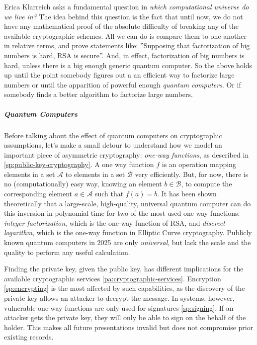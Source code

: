 Erica Klarreich asks a fundamental question in \emph{which computational universe do we live in?}\cite{KlarUniverse22}
The idea behind this question is the fact that until now, we do not have any mathematical proof of the absolute difficulty
of breaking any of the available cryptographic schemes.
All we can do is compare them to one another in relative terms, and prove statements like: 
''Supposing that factorization of big numbers is hard, RSA is secure''.
And, in effect, factorization of big numbers is hard, unless there is a big enough generic quantum computer.
So the above holds up until the point somebody figures out a an efficient way to factorize large numbers or until the apparition of powerful enough \emph{quantum computers}.
Or if somebody finds a better algorithm to factorize large numbers. 

\subparagraph{Quantum Computers}

Before talking about the effect of quantum computers on cryptographic assumptions, let's make a small detour to understand how we model an important piece of asymmetric cryptography: \emph{one-way functions}, as described in
\ref{sp:public-key-cryptography}.
A one way function $f$ is an operation mapping elements in a set $\mathcal{A}$ to elements in a set $\mathcal{B}$ very efficiently. But, for now, there is no (computationally) easy way, knowing an element $b \in \mathcal{B}$, to compute the corresponding element $a \in \mathcal{A}$ such that $f(a) = b$.
It has been shown theoretically that a large-scale, high-quality, universal
quantum computer \cite[s. 2.1]{TaurusQuantum23} can do this inversion in polynomial time for two of the most used one-way functions: 
\emph{integer factorization}, which is the one-way function of RSA, 
and \emph{discreet logarithm}, which is the one-way function in Elliptic Curve cryptography.
Publicly known quantum computers in 2025 are only \emph{universal}, but lack
the scale and the quality to perform any useful calculation.

Finding the private key, given the public key, has different implications for
the available cryptographic services \ref{pa:cryptographic-services}.
Encryption \ref{sp:encrypting} is the most affected by such capabilities, as the discovery
of the private key allows an attacker to decrypt the message.
In \eid systems, however, vulnerable one-way functions are only used for
signatures \ref{sp:signing}.
If an attacker gets the private key, they will only be able to sign
on the behalf of the holder. This makes all future presentations invalid but does not compromise prior existing records.

